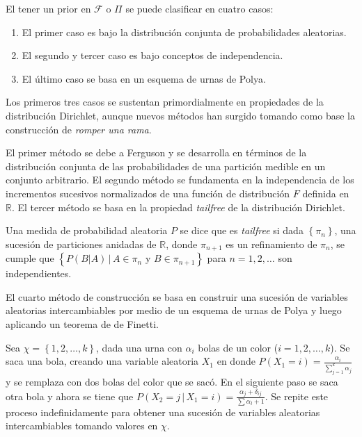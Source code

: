 El tener un prior en $\mathcal{F}$ o $\Pi$ se puede clasificar en cuatro casos:
\begin{enumerate}
    \item El primer caso es bajo la distribución conjunta de probabilidades aleatorias.
    \item El segundo y tercer caso es bajo conceptos de independencia.
    \item El último caso se basa en un esquema de urnas de Polya.
\end{enumerate}
Los primeros tres casos se sustentan primordialmente en propiedades de la distribución Dirichlet, aunque nuevos métodos han surgido %
tomando como base la construcción de \textit{romper una rama}.

El primer método se debe a Ferguson y se desarrolla en términos de la distribución conjunta de las probabilidades de una partición %
medible en un conjunto arbitrario. El segundo método se fundamenta en la independencia de los incrementos sucesivos normalizados %
de una función de distribución $F$ definida en $\mathbb{R}$. El tercer método se basa en la propiedad \textit{tailfree} de la %
distribución Dirichlet.

\begin{defi}[Tailfree]
Una medida de probabilidad aleatoria $P$ se dice que es \textit{tailfree} si dada $\left\{ \pi_{n} \right\}$, una sucesión de %
particiones anidadas de $\mathbb{R}$, donde $\pi_{n+1}$ es un refinamiento de $\pi_{n}$, se cumple que %
$\left\{ %
P \left( B | A \right) \,|\, A \in \pi_{n} \text{ y } B \in \pi_{n+1} %
\right\}$ para $n = 1,2,\ldots$ son independientes.
\end{defi}

El cuarto método de construcción se basa en construir una sucesión de variables aleatorias intercambiables por medio de un %
esquema de urnas de Polya y luego aplicando un teorema de de Finetti.

\begin{defi}
Sea $\chi = \left\{ 1, 2, \ldots, k \right\}$, dada una urna con $\alpha_{i}$ bolas de un color ($i = 1, 2, \ldots, k$). %
Se saca una bola, creando una variable aleatoria $X_{1}$ en donde $P \left( X_{1} = i \right) = \frac{\alpha_{i}}{\sum_{j = 1}^{k} %
\alpha_{j}}$ y se remplaza con dos bolas del color que se sacó. En el siguiente paso se saca otra bola y ahora se tiene que $ P %
\left( X_{2} = j \,|\, X_{1} = i \right) = \frac{\alpha_{j} + \delta_{ij}}{\sum \alpha_{l} + 1} $. Se repite este proceso %
indefinidamente para obtener una sucesión de variables aleatorias intercambiables tomando valores en $\chi$.
\end{defi}

